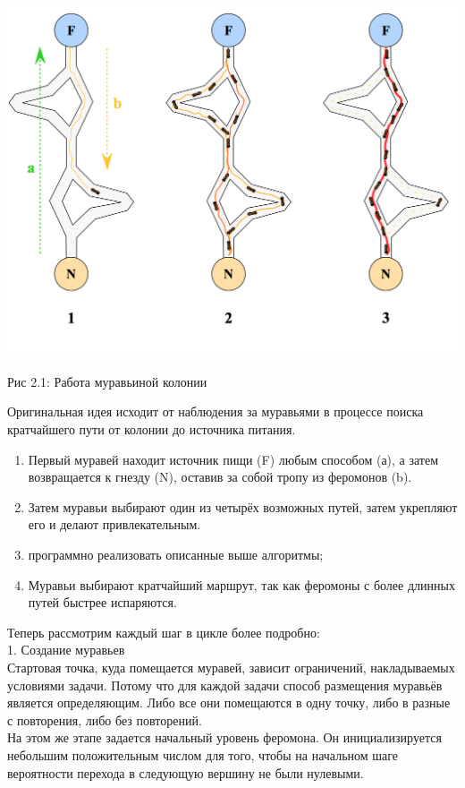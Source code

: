 \documentclass[12pt]{report}
\begin{document}
\begin{center}
		\includegraphics[scale=0.4]{pics/Ants.png}
		
			Рис 2.1: Работа муравьиной колонии
\end{center}

Оригинальная идея исходит от наблюдения за муравьями в процессе поиска кратчайшего пути от колонии до источника питания.
\begin{enumerate}
\item Первый муравей находит источник пищи (F) любым способом (а), а затем возвращается к гнезду (N), оставив за собой тропу из феромонов (b).
\item Затем муравьи выбирают один из четырёх возможных путей, затем укрепляют его и делают привлекательным.
\item программно реализовать описанные выше алгоритмы;
\item Муравьи выбирают кратчайший маршрут, так как феромоны с более длинных путей быстрее испаряются.
\end{enumerate}

Теперь рассмотрим каждый шаг в цикле более подробно:\\

1. Создание муравьев\\
   Стартовая точка, куда помещается муравей, зависит ограничений,   накладываемых условиями задачи. Потому что для каждой задачи   способ размещения муравьёв является определяющим. Либо все они помещаются в одну точку, либо в разные с повторения, либо без повторений. \\
  На этом же этапе задается начальный уровень феромона. Он инициализируется небольшим положительным числом для того, чтобы на начальном шаге вероятности перехода в следующую  вершину не были нулевыми. \\
  
\end{document}
